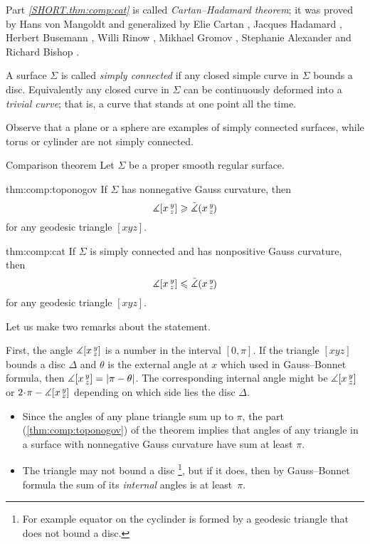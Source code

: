 Part \textit{\ref{SHORT.thm:comp:cat}} is called \emph{Cartan--Hadamard theorem};
it was proved by 
Hans von Mangoldt \cite{mangoldt} and generalized by Elie Cartan \cite{cartan}, Jacques Hadamard \cite{hadamard},
Herbert Busemann \cite{busemann},
Willi Rinow \cite{rinow},
Mikhael Gromov \cite[p.~119]{gromov},
Stephanie Alexander and Richard Bishop \cite{a-b:h-c}.

A surface $\Sigma$ is called \emph{simply connected} if any closed simple curve in $\Sigma$ bounds a disc.
Equivalently any closed curve in $\Sigma$ can be continuously deformed into a \emph{trivial curve}; that is, a curve that stands at one point all the time.

Observe that a plane or a sphere are examples of simply connected surfaces, while torus or cylinder are not simply connected.


\begin{thm}{Comparison theorem}\label{thm:comp}
Let $\Sigma$ be a proper smooth regular surface.

\begin{subthm}{thm:comp:toponogov}
If $\Sigma$ has nonnegative Gauss curvature, then 
 \[\measuredangle[x\,{}^{y}_{z}]\geqslant\tilde\measuredangle(x\,{}^{y}_{z}\hspace{-0.2ex})\]
for any geodesic triangle $[xyz]$.
\end{subthm}

\begin{subthm}{thm:comp:cat}
If $\Sigma$ is simply connected and has nonpositive Gauss curvature,
 then 
\[\measuredangle[x\,{}^{y}_{z}]\leqslant\tilde\measuredangle(x\,{}^{y}_{z}\hspace{-0.2ex})\]
for any geodesic triangle $[xyz]$.
\end{subthm}

\end{thm}


Let us make two remarks about the statement.

First, the angle $\measuredangle[x\,{}^{y}_{z}]$ is a number in the interval $[0,\pi]$.
If the triangle $[xyz]$ bounds a disc $\Delta$ and $\theta$ is the external angle at  $x$ which used in Gauss--Bonnet formula, 
then $\measuredangle[x\,{}^{y}_{z}]=|\pi-\theta|$.
The corresponding internal angle might be $\measuredangle[x\,{}^{y}_{z}]$ or $2\cdot\pi-\measuredangle\hinge {x}{y}{z}$ depending on which side lies the disc $\Delta$.

\begin{itemize}
\item Since the angles of any plane triangle sum up to $\pi$,
the part (\ref{thm:comp:toponogov}) of the theorem implies that angles of any triangle in a surface with nonnegative Gauss curvature have sum at least $\pi$.

\item The triangle may not bound a disc%
\footnote{For example equator on the cyclinder is formed by a geodesic triangle that does not bound a disc.}, but  if it does, then by Gauss--Bonnet formula the sum of its {}\emph{internal} angles is at least~$\pi$.
\end{itemize}

